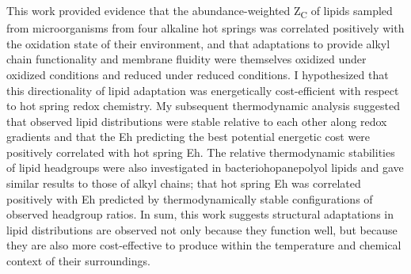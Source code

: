 This work provided evidence that the abundance-weighted Z\textsubscript{C} of lipids sampled from microorganisms from four alkaline hot springs was correlated positively with the oxidation state of their environment, and that adaptations to provide alkyl chain functionality and membrane fluidity were themselves oxidized under oxidized conditions and reduced under reduced conditions. I hypothesized that this directionality of lipid adaptation was energetically cost-efficient with respect to hot spring redox chemistry. My subsequent thermodynamic analysis suggested that observed lipid distributions were stable relative to each other along redox gradients and that the Eh predicting the best potential energetic cost were positively correlated with hot spring Eh. The relative thermodynamic stabilities of lipid headgroups were also investigated in bacteriohopanepolyol lipids and gave similar results to those of alkyl chains; that hot spring Eh was correlated positively with Eh predicted by thermodynamically stable configurations of observed headgroup ratios. In sum, this work suggests structural adaptations in lipid distributions are observed not only because they function well, but because they are also more cost-effective to produce within the temperature and chemical context of their surroundings.